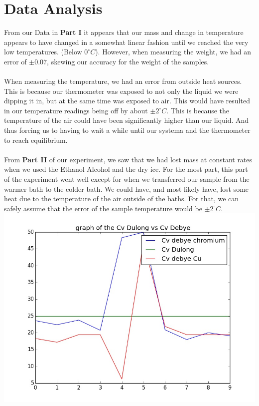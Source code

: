 \documentclass[12pt]{report}
\begin{document}
\section{Data Analysis}
	 From our Data in \textbf{Part I} it appears that our mass and change in temperature appears to have changed in a 
somewhat linear fashion until we reached the very low temperatures. (Below $0^{\circ}C$). However, when measuring the weight, we had an error of $\pm 0.07$, skewing our accuracy for the weight of the samples. \\
	\\When measuring the temperature, we had an error from outside heat sources. This is because our thermometer was exposed to not only the liquid we were dipping it in, but at the same time was exposed to air. This would have resulted in our temperature readings being off by about $\pm 2^{\circ}C$. This is because the temperature of the air could have been significantly higher than our liquid. And thus forcing us to having to wait a while until our systema and the thermometer to reach equilibrium. \\
	\\From \textbf{Part II} of our experiment, we saw that we had lost mass at constant rates when we used the Ethanol Alcohol and the dry ice. For the most part, this part of the experiment went well except for when we transferred our sample from the warmer bath to the colder bath. We could have, and most likely have, lost some heat due to the temperature of the air outside of the baths. For that, we can safely assume that the error of the sample temperature would be $\pm 2^{\circ}C$. \\
\includegraphics[scale=0.5]{chromium_debye&cudebye}\\
\end{document}
